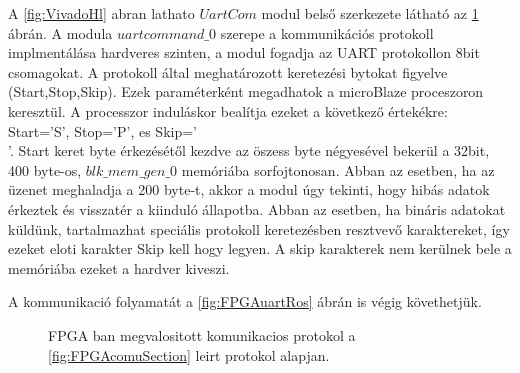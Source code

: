 A \ref{fig:VivadoHl} abran lathato $UartCom$ modul belső szerkezete látható az \ref{fig:UartComVivaldo} ábrán. A modula $uartcommand\_0$ szerepe a kommunikációs protokoll implmentálása hardveres szinten, a modul fogadja az UART protokollon 8bit csomagokat. A protokoll által meghatározott keretezési bytokat figyelve (Start,Stop,Skip). Ezek paraméterként megadhatok a microBlaze proceszoron keresztül. A processzor induláskor bealítja ezeket a következő értekékre: Start='S', Stop='P', es Skip='\\'. 
Start keret byte érkezésétől kezdve az öszess byte négyesével bekerül a 32bit, 400 byte-os, $blk\_mem\_gen\_0$ memóriába sorfojtonosan. Abban az esetben, ha az üzenet meghaladja a 200 byte-t, akkor a modul úgy tekinti, hogy hibás adatok érkeztek és visszatér a kiinduló állapotba. Abban az esetben, ha bináris adatokat küldünk, tartalmazhat speciális protokoll keretezésben resztvevő karaktereket,  így ezeket eloti karakter Skip kell hogy legyen. A skip karakterek nem kerülnek bele a memóriába ezeket a hardver kiveszi.


A kommunikació  folyamatát a \ref{fig:FPGAuartRos} ábrán is végig követhetjük.

\begin{figure}[H]		
  \caption{FPGA ban megvalositott komunikacios protokol a 	     \ref{fig:FPGAcomuSection} leirt protokol alapjan.}
  \label{fig:UartComVivaldo}
\end{figure}


